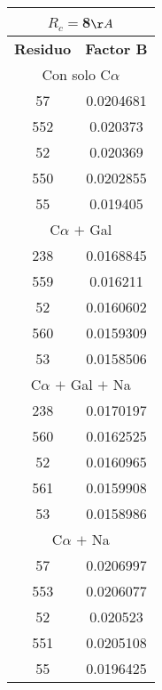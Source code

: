 \begin{tabular}[c]{|c|c|}
\multicolumn{2}{c}{$R_c=$8$\AA$}\\\hline
\textbf{Residuo}&\textbf{Factor B}\\\hline
\multicolumn{2}{c}{Con solo C$\alpha$}\\\hline
        57& 0.0204681\\
       552&  0.020373\\
        52&  0.020369\\
       550& 0.0202855\\
        55&  0.019405\\\hline
\multicolumn{2}{c}{C$\alpha$ $+$ Gal}\\\hline
       238& 0.0168845\\
       559&  0.016211\\
        52& 0.0160602\\
       560& 0.0159309\\
        53& 0.0158506\\\hline
\multicolumn{2}{c}{C$\alpha$ $+$ Gal $+$ Na}\\\hline
       238& 0.0170197\\
       560& 0.0162525\\
        52& 0.0160965\\
       561& 0.0159908\\
        53& 0.0158986\\\hline
\multicolumn{2}{c}{C$\alpha$ $+$ Na}\\\hline
        57& 0.0206997\\
       553& 0.0206077\\
        52&  0.020523\\
       551& 0.0205108\\
        55& 0.0196425\\\hline
\end{tabular}
